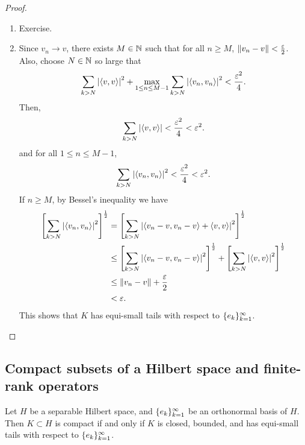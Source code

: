 \documentclass[a4paper]{article}
\renewcommand{\braket}[2]{\left\langle #1, #1 \right\rangle}
\begin{document}
\begin{proof}
  \begin{enumerate}
    \item Exercise.

    \item Since $v_n \to v$, there exists
          $M \in \mathbb{N}$ such that for all $n \geq M$,
          $\left\lVert v_n - v\right\rVert < \frac{\varepsilon}{2}$. Also, choose
          $N \in \mathbb{N}$ so large that
          \[
            \sum_{k > N} \abs{\braket{v}{e_n}}^2
            + \max_{1 \leq n \leq M - 1} \sum_{k > N}
            \abs{\braket{v_n}{e_k}}^2 < \frac{\epsilon^2}{4}.
          \]
          Then,
          \[
            \sum_{k > N} \abs{\braket{v}{e_n}} < \frac{\epsilon^2}{4}
            < \epsilon^2.
          \]
          and for all $1 \leq n \leq M - 1$,
          \[
            \sum_{k > N} \abs{\braket{v_n}{e_k}}^2 < \frac{\epsilon^2}{4}
            < \epsilon^2.
          \]
          If $n \geq M$, by Bessel's inequality we have
          \[
            \begin{aligned}
              \left[ \sum_{k > N} \abs{\braket{v_n}{e_k}}^2 \right]^{\frac{1}{2}}
               & = \left[ \sum_{k > N} \abs{\braket{v_n - v}{e_k} + \braket{v}{e_k}}^2
                     \right]^{\frac{1}{2}} \\
               & \leq
              \left[ \sum_{k > N} \abs{\braket{v_n - v}{e_k}}^2 \right]^{\frac{1}{2}}
              + \left[ \sum_{k > N} \abs{\braket{v}{e_k}}^2  \right]^{\frac{1}{2}}     \\
               & \leq \norm{v_n - v} + \frac{\epsilon}{2}                              \\
               & < \epsilon.
            \end{aligned}
          \]
          This shows that $K$ has equi-small tails with respect
          to $\{ e_k \}_{k=1}^\infty$.
  \end{enumerate}
\end{proof}

\subsection{Compact subsets of a Hilbert space and
  finite-rank operators}

\begin{thm}
  Let $H$ be a separable Hilbert space, and
  $\{ e_k \}_{k=1}^\infty$ be an orthonormal basis of $H$.
  Then $K \subset H$ is compact if and only if
  $K$ is closed, bounded, and has equi-small tails
  with respect to $\{ e_k \}_{k=1}^\infty$.
\end{thm}
\end{document}
